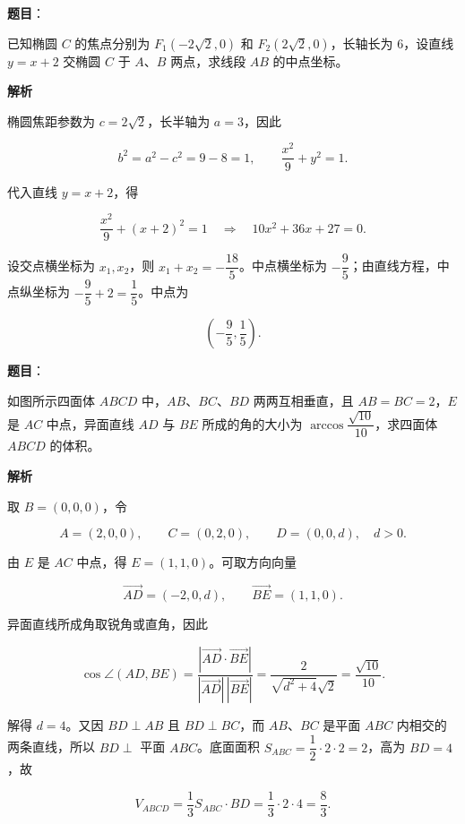 \begin{answer}

\textbf{题目}：

已知椭圆 $C$ 的焦点分别为 $F_1(-2\sqrt{2},0)$ 和 $F_2(2\sqrt{2},0)$，长轴长为 6，设直线 $y=x+2$ 交椭圆 $C$ 于 $A$、$B$ 两点，求线段 $AB$ 的中点坐标。

\textbf{解析}

椭圆焦距参数为 $c=2\sqrt2$，长半轴为 $a=3$，因此

\nopagebreak[4]
\[
b^2=a^2-c^2=9-8=1,
\qquad
\frac{x^2}{9}+y^2=1.
\]

代入直线 $y=x+2$，得

\nopagebreak[4]
\[
\frac{x^2}{9}+(x+2)^2=1
\quad\Longrightarrow\quad
10x^2+36x+27=0.
\]

设交点横坐标为 $x_1,x_2$，则 $x_1+x_2=-\dfrac{18}{5}$。中点横坐标为 $-\dfrac95$；由直线方程，中点纵坐标为 $-\dfrac95+2=\dfrac15$。中点为

\nopagebreak[4]
\[
\left(-\frac95,\frac15\right).
\]


\end{answer}
\begin{answer}

\textbf{题目}：

如图所示四面体 $ABCD$ 中，$AB$、$BC$、$BD$ 两两互相垂直，且 $AB=BC=2$，$E$ 是 $AC$ 中点，异面直线 $AD$ 与 $BE$ 所成的角的大小为 $\arccos\dfrac{\sqrt{10}}{10}$，求四面体 $ABCD$ 的体积。
\nopagebreak[4]
\begin{center}\end{center}
\nopagebreak[4]
\textbf{解析}

取 $B=(0,0,0)$，令

\nopagebreak[4]
\[
A=(2,0,0),\qquad C=(0,2,0),\qquad D=(0,0,d),\quad d>0.
\]

由 $E$ 是 $AC$ 中点，得 $E=(1,1,0)$。可取方向向量

\nopagebreak[4]
\[
\overrightarrow{AD}=(-2,0,d),\qquad \overrightarrow{BE}=(1,1,0).
\]

异面直线所成角取锐角或直角，因此

\nopagebreak[4]
\[
\cos\angle(AD,BE)
=\frac{|\overrightarrow{AD}\cdot\overrightarrow{BE}|}
{|\overrightarrow{AD}|\,|\overrightarrow{BE}|}
=\frac{2}{\sqrt{d^2+4}\sqrt2}
=\frac{\sqrt{10}}{10}.
\]

解得 $d=4$。又因 $BD\perp AB$ 且 $BD\perp BC$，而 $AB$、$BC$ 是平面 $ABC$ 内相交的两条直线，所以 $BD\perp$ 平面 $ABC$。底面面积 $S_{ABC}=\dfrac12\cdot2\cdot2=2$，高为 $BD=4$，故

\nopagebreak[4]
\[
V_{ABCD}=\frac13S_{ABC}\cdot BD=\frac13\cdot2\cdot4=\frac83.
\]


\end{answer}
